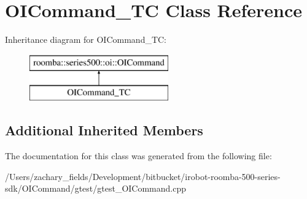 \hypertarget{class_o_i_command___t_c}{\section{O\+I\+Command\+\_\+\+T\+C Class Reference}
\label{class_o_i_command___t_c}
}
Inheritance diagram for O\+I\+Command\+\_\+\+T\+C\+:\begin{figure}[H]
\begin{center}
\leavevmode
\includegraphics[height=2.000000cm]{class_o_i_command___t_c}
\end{center}
\end{figure}
\subsection*{Additional Inherited Members}


The documentation for this class was generated from the following file\+:\begin{DoxyCompactItemize}
\item 
/\+Users/zachary\+\_\+fields/\+Development/bitbucket/irobot-\/roomba-\/500-\/series-\/sdk/\+O\+I\+Command/gtest/gtest\+\_\+\+O\+I\+Command.\+cpp\end{DoxyCompactItemize}
